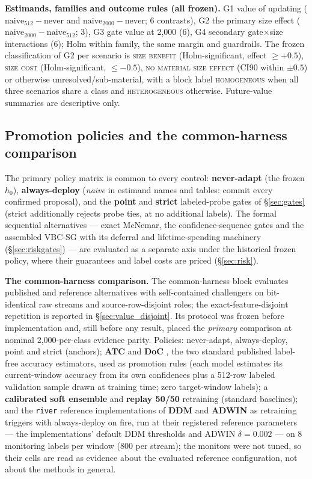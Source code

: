 \documentclass[journal]{IEEEtran}
\begin{document}
\textbf{Estimands, families and outcome rules (all frozen).} G1 value of updating ($\mathrm{naive}_{512}-\mathrm{never}$ and $\mathrm{naive}_{2000}-\mathrm{never}$; 6 contrasts), G2 the primary size effect ($\mathrm{naive}_{2000}-\mathrm{naive}_{512}$; 3), G3 gate value at 2{,}000 (6), G4 secondary gate$\times$size interactions (6); Holm within family, the same margin and guardrails. The frozen classification of G2 per scenario is \textsc{size benefit} (Holm-significant, effect $\ge +0.5$), \textsc{size cost} (Holm-significant, $\le -0.5$), \textsc{no material size effect} (CI90 within $\pm0.5$) or otherwise unresolved/sub-material, with a block label \textsc{homogeneous} when all three scenarios share a class and \textsc{heterogeneous} otherwise. Future-value summaries are descriptive only.

\subsection{Promotion policies and the common-harness comparison}
\label{sec:baselines_method}

The primary policy matrix is common to every control: \textbf{never-adapt} (the frozen $h_0$), \textbf{always-deploy} (\emph{naive} in estimand names and tables: commit every confirmed proposal), and the \textbf{point} and \textbf{strict} labeled-probe gates of \S\ref{sec:gates} (strict additionally rejects probe ties, at no additional labels). The formal sequential alternatives --- exact McNemar, the confidence-sequence gates and the assembled VBC-SG with its deferral and lifetime-spending machinery (\S\ref{sec:riskgates}) --- are evaluated as a separate axis under the historical frozen policy, where their guarantees and label costs are priced (\S\ref{sec:risk}).

\textbf{The common-harness comparison.} The common-harness block evaluates published and reference alternatives with self-contained challengers on bit-identical raw streams and source-row-disjoint roles; the exact-feature-disjoint repetition is reported in \S\ref{sec:value_disjoint}. Its protocol was frozen before implementation and, still before any result, placed the \emph{primary} comparison at nominal 2{,}000-per-class evidence parity. Policies: never-adapt, always-deploy, point and strict (anchors); \textbf{ATC} \cite{garg2022atc} and \textbf{DoC} \cite{guillory2021doc}, the two standard published label-free accuracy estimators, used as promotion rules (each model estimates its current-window accuracy from its own confidences plus a 512-row labeled validation sample drawn at training time; zero target-window labels); a \textbf{calibrated soft ensemble} and \textbf{replay 50/50} retraining (standard baselines); and the \texttt{river} reference implementations of \textbf{DDM} and \textbf{ADWIN} \cite{gama2004learning,bifet2007learning} as retraining triggers with always-deploy on fire, run at their registered reference parameters --- the implementations' default DDM thresholds and ADWIN $\delta=0.002$ --- on 8 monitoring labels per window (800 per stream); the monitors were not tuned, so their cells are read as evidence about the evaluated reference configuration, not about the methods in general.
\end{document}
